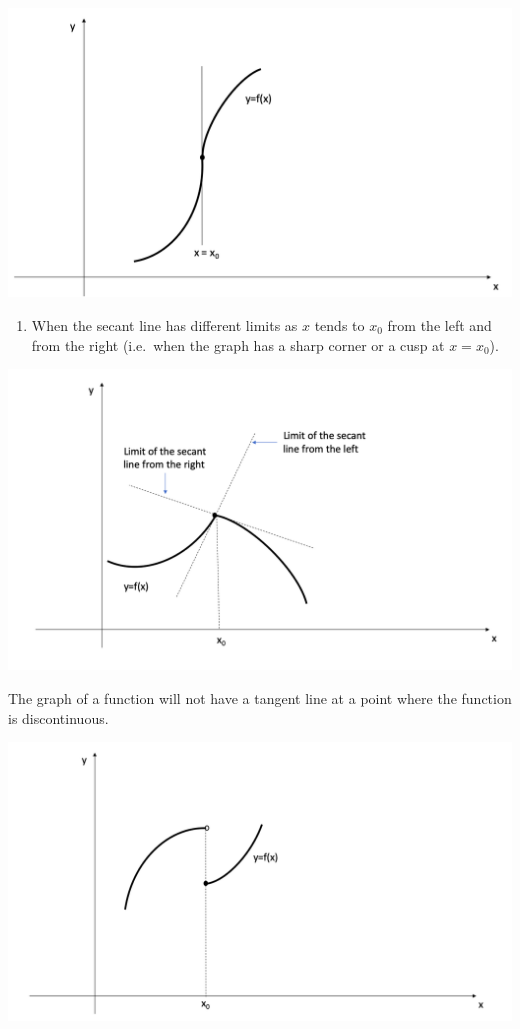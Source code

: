 \documentclass[]{book}
\providecommand{\tightlist}{%
  \setlength{\itemsep}{0pt}\setlength{\parskip}{0pt}}
\begin{document}
\begin{center}\includegraphics[width=1\linewidth]{figure/5Derivatives-6} \end{center}

\begin{enumerate}
\def\labelenumi{\arabic{enumi}.}
\setcounter{enumi}{1}
\tightlist
\item
  When the secant line has different limits as \(x\) tends to \(x_0\) from the left and from the right (i.e.~when the graph has a sharp corner or a cusp at \(x=x_0\)).
\end{enumerate}

\includegraphics[width=1\linewidth]{figure/5Derivatives-7}

\newpage

The graph of a function will not have a tangent line at a point where the function is discontinuous.

\begin{center}\includegraphics[width=1\linewidth]{figure/5Derivatives-5} \end{center}
\end{document}
